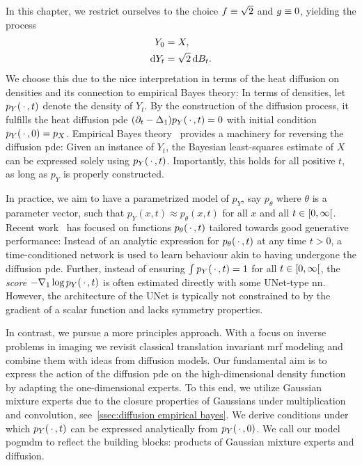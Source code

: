 In this chapter, we restrict ourselves to the choice \( f \equiv \sqrt{\num{2}} \) and \( g \equiv \num{0} \), yielding the process
\begin{equation}
	\begin{aligned}
		Y_{\num{0}} &= X, \\
		\mathrm{d}Y_t &= \sqrt{\num{2}}\,\mathrm{d}B_t.
	\end{aligned}
	\label{eq:pogmdm diffusion}
\end{equation}
We choose this due to the nice interpretation in terms of the heat diffusion on densities and its connection to empirical Bayes theory:
In terms of densities, let \( p_Y(\,\cdot\,, t) \) denote the density of \( Y_t \).
By the construction of the diffusion process, it fulfills the heat diffusion \gls{pde} \( (\partial_t - \Delta_{\num{1}})p_Y(\,\cdot\,, t) = \num{0} \) with initial condition \( p_Y(\,\cdot\,, \num{0}) = p_X \).
Empirical Bayes theory~\cite{robbins_empirical_1956} provides a machinery for reversing the diffusion \gls{pde}:
Given an instance of \( Y_t \), the Bayesian least-squares estimate of \( X \) can be expressed solely using \( p_Y(\,\cdot\,, t) \).
Importantly, this holds for all positive \( t \), as long as \( p_Y \) is properly constructed.

In practice, we aim to have a parametrized model of \( p_Y \), say \( p_\theta \) where \( \theta \) is a parameter vector, such that \( p_Y(x, t) \approx p_\theta(x, t) \) for all \( x \) and all \( t \in \rinterval{\num{0}}{\infty} \).
Recent work~\cite{song_generative_2019,song_scorebased_2021} has focused on functions \( p_\theta(\,\cdot\,, t) \) tailored towards good generative performance:
Instead of an analytic expression for \( p_\theta(\,\cdot\,, t) \) at any time \( t > \num{0} \), a time-conditioned network is used to learn behaviour akin to having undergone the diffusion \gls{pde}.
Further, instead of ensuring \( \int p_Y(\,\cdot\,, t) = \num{1} \) for all \( t \in \rinterval{\num{0}}{\infty} \), the \emph{score} \( -\nabla_{\num{1}} \log p_Y(\,\cdot\,, t) \) is often estimated directly with some UNet-type \gls{nn}.
However, the architecture of the UNet is typically not constrained to by the gradient of a scalar function and lacks symmetry properties.

In contrast, we pursue a more principles approach.
With a focus on inverse problems in imaging we revisit classical translation invariant \gls{mrf} modeling and combine them with ideas from diffusion models.
Our fundamental aim is to express the action of the diffusion \gls{pde} on the high-dimensional density function by adapting the one-dimensional experts.
To this end, we utilize Gaussian mixture experts due to the closure properties of Gaussians under multiplication and convolution, see~\cref{ssec:diffusion empirical bayes}.
We derive conditions under which \( p_Y(\,\cdot\,, t) \) can be expressed analytically from \( p_Y(\,\cdot\,, \num{0}) \).
We call our model \gls{pogmdm} to reflect the building blocks: products of Gaussian mixture experts and diffusion.
